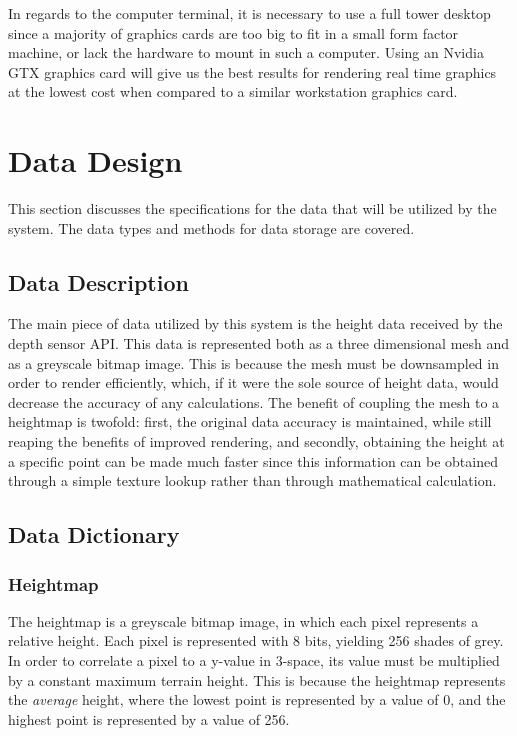 \documentclass[onecolumn, draftclsnofoot,10pt, compsoc]{IEEEtran}
\begin{document}
In regards to the computer terminal, it is necessary to use a full tower desktop since a majority of graphics cards are too big to fit in a small form factor machine, or lack the hardware to mount in such a computer. Using an Nvidia GTX graphics card will give us the best results for rendering real time graphics at the lowest cost when compared to a similar workstation graphics card.

\section{Data Design} %
This section discusses the specifications for the data that will be utilized by the system. The data types and methods for data storage are covered.
\subsection{Data Description}
The main piece of data utilized by this system is the height data received by the depth sensor API. This data is represented both as a three dimensional mesh and as a greyscale bitmap image. 
This is because the mesh must be downsampled in order to render efficiently, which, if it were the sole source of height data, would decrease the accuracy of any calculations. 
The benefit of coupling the mesh to a heightmap is twofold: first, the original data accuracy is maintained, while still reaping the benefits of improved rendering, and secondly, obtaining the height at a specific point can be made much faster since this information can be obtained through a simple texture lookup rather than through mathematical calculation.  

\subsection{Data Dictionary}
\subsubsection{Heightmap}
The heightmap is a greyscale bitmap image, in which each pixel represents a relative height. 
Each pixel is represented with 8 bits, yielding 256 shades of grey. 
In order to correlate a pixel to a y-value in 3-space, its value must be multiplied by a constant maximum terrain height. 
This is because the heightmap represents the \textit{average} height, where the lowest point is represented by a value of 0, and the highest point is represented by a value of 256.
\end{document}
